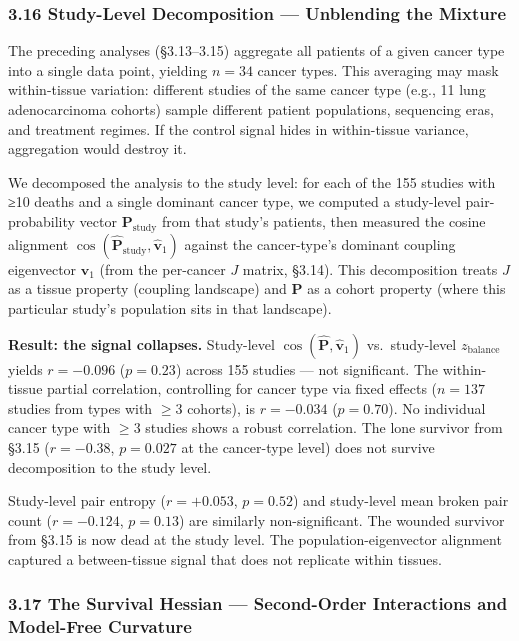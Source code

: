 \documentclass[
  11pt,
]{article}
\begin{document}
\subsubsection{3.16 Study-Level Decomposition --- Unblending the
Mixture}\label{study-level-decomposition-unblending-the-mixture}

The preceding analyses (§3.13--3.15) aggregate all patients of a given
cancer type into a single data point, yielding \(n = 34\) cancer types.
This averaging may mask within-tissue variation: different studies of
the same cancer type (e.g., 11 lung adenocarcinoma cohorts) sample
different patient populations, sequencing eras, and treatment regimes.
If the control signal hides in within-tissue variance, aggregation would
destroy it.

We decomposed the analysis to the study level: for each of the 155
studies with ≥10 deaths and a single dominant cancer type, we computed a
study-level pair-probability vector \(\mathbf{P}_\mathrm{study}\) from
that study's patients, then measured the cosine alignment
\(\cos(\hat{\mathbf{P}}_\mathrm{study}, \hat{\mathbf{v}}_1)\) against
the cancer-type's dominant coupling eigenvector \(\hat{\mathbf{v}}_1\)
(from the per-cancer \(J\) matrix, §3.14). This decomposition treats
\(J\) as a tissue property (coupling landscape) and \(\mathbf{P}\) as a
cohort property (where this particular study's population sits in that
landscape).

\textbf{Result: the signal collapses.} Study-level
\(\cos(\hat{\mathbf{P}}, \hat{\mathbf{v}}_1)\) vs.~study-level
\(z_\mathrm{balance}\) yields \(r = -0.096\) (\(p = 0.23\)) across 155
studies --- not significant. The within-tissue partial correlation,
controlling for cancer type via fixed effects (\(n = 137\) studies from
types with \(\geq 3\) cohorts), is \(r = -0.034\) (\(p = 0.70\)). No
individual cancer type with \(\geq 3\) studies shows a robust
correlation. The lone survivor from §3.15 (\(r = -0.38\), \(p = 0.027\)
at the cancer-type level) does not survive decomposition to the study
level.

Study-level pair entropy (\(r = +0.053\), \(p = 0.52\)) and study-level
mean broken pair count (\(r = -0.124\), \(p = 0.13\)) are similarly
non-significant. The wounded survivor from §3.15 is now dead at the
study level. The population-eigenvector alignment captured a
between-tissue signal that does not replicate within tissues.

\subsubsection{3.17 The Survival Hessian --- Second-Order Interactions
and Model-Free
Curvature}\label{the-survival-hessian-second-order-interactions-and-model-free-curvature}
\end{document}
